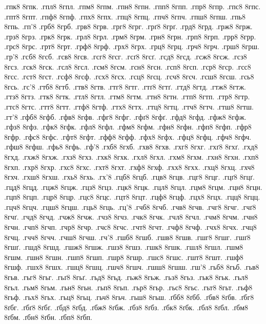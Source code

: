 {.гпк8 8гпк.
.гпл8 8гпл.
.гпм8 8гпм.
.гпн8 8гпн.
.гпп8 8гпп.
.гпр8 8гпр.
.гпс8 8гпс.
.гпт8 8гпт.
.гпф8 8гпф.
.гпх8 8гпх.
.гпц8 8гпц.
.гпч8 8гпч.
.гпш8 8гпш.
.гпь8 8гпь.
.гп'8
.грб8 8грб.
.грв8 8грв.
.грг8 8грг.
.грґ8 8грґ.
.грд8 8грд.
.грж8 8грж.
.грз8 8грз.
.грк8 8грк.
.грл8 8грл.
.грм8 8грм.
.грн8 8грн.
.грп8 8грп.
.грр8 8грр.
.грс8 8грс.
.грт8 8грт.
.грф8 8грф.
.грх8 8грх.
.грц8 8грц.
.грч8 8грч.
.грш8 8грш.
.гр'8
.гсб8 8гсб.
.гсв8 8гсв.
.гсг8 8гсг.
.гсґ8 8гсґ.
.гсд8 8гсд.
.гсж8 8гсж.
.гсз8 8гсз.
.гск8 8гск.
.гсл8 8гсл.
.гсм8 8гсм.
.гсн8 8гсн.
.гсп8 8гсп.
.гср8 8гср.
.гсс8 8гсс.
.гст8 8гст.
.гсф8 8гсф.
.гсх8 8гсх.
.гсц8 8гсц.
.гсч8 8гсч.
.гсш8 8гсш.
.гсь8 8гсь.
.гс'8
.гтб8 8гтб.
.гтв8 8гтв.
.гтг8 8гтг.
.гтґ8 8гтґ.
.гтд8 8гтд.
.гтж8 8гтж.
.гтз8 8гтз.
.гтк8 8гтк.
.гтл8 8гтл.
.гтм8 8гтм.
.гтн8 8гтн.
.гтп8 8гтп.
.гтр8 8гтр.
.гтс8 8гтс.
.гтт8 8гтт.
.гтф8 8гтф.
.гтх8 8гтх.
.гтц8 8гтц.
.гтч8 8гтч.
.гтш8 8гтш.
.гт'8
.гфб8 8гфб.
.гфв8 8гфв.
.гфг8 8гфг.
.гфґ8 8гфґ.
.гфд8 8гфд.
.гфж8 8гфж.
.гфз8 8гфз.
.гфк8 8гфк.
.гфл8 8гфл.
.гфм8 8гфм.
.гфн8 8гфн.
.гфп8 8гфп.
.гфр8 8гфр.
.гфс8 8гфс.
.гфт8 8гфт.
.гфф8 8гфф.
.гфх8 8гфх.
.гфц8 8гфц.
.гфч8 8гфч.
.гфш8 8гфш.
.гфь8 8гфь.
.гф'8
.гхб8 8гхб.
.гхв8 8гхв.
.гхг8 8гхг.
.гхґ8 8гхґ.
.гхд8 8гхд.
.гхж8 8гхж.
.гхз8 8гхз.
.гхк8 8гхк.
.гхл8 8гхл.
.гхм8 8гхм.
.гхн8 8гхн.
.гхп8 8гхп.
.гхр8 8гхр.
.гхс8 8гхс.
.гхт8 8гхт.
.гхф8 8гхф.
.гхх8 8гхх.
.гхц8 8гхц.
.гхч8 8гхч.
.гхш8 8гхш.
.гхь8 8гхь.
.гх'8
.гцб8 8гцб.
.гцв8 8гцв.
.гцг8 8гцг.
.гцґ8 8гцґ.
.гцд8 8гцд.
.гцж8 8гцж.
.гцз8 8гцз.
.гцк8 8гцк.
.гцл8 8гцл.
.гцм8 8гцм.
.гцн8 8гцн.
.гцп8 8гцп.
.гцр8 8гцр.
.гцс8 8гцс.
.гцт8 8гцт.
.гцф8 8гцф.
.гцх8 8гцх.
.гцц8 8гцц.
.гцч8 8гцч.
.гцш8 8гцш.
.гць8 8гць.
.гц'8
.гчб8 8гчб.
.гчв8 8гчв.
.гчг8 8гчг.
.гчґ8 8гчґ.
.гчд8 8гчд.
.гчж8 8гчж.
.гчз8 8гчз.
.гчк8 8гчк.
.гчл8 8гчл.
.гчм8 8гчм.
.гчн8 8гчн.
.гчп8 8гчп.
.гчр8 8гчр.
.гчс8 8гчс.
.гчт8 8гчт.
.гчф8 8гчф.
.гчх8 8гчх.
.гчц8 8гчц.
.гчч8 8гчч.
.гчш8 8гчш.
.гч'8
.гшб8 8гшб.
.гшв8 8гшв.
.гшг8 8гшг.
.гшґ8 8гшґ.
.гшд8 8гшд.
.гшж8 8гшж.
.гшз8 8гшз.
.гшк8 8гшк.
.гшл8 8гшл.
.гшм8 8гшм.
.гшн8 8гшн.
.гшп8 8гшп.
.гшр8 8гшр.
.гшс8 8гшс.
.гшт8 8гшт.
.гшф8 8гшф.
.гшх8 8гшх.
.гшц8 8гшц.
.гшч8 8гшч.
.гшш8 8гшш.
.гш'8
.гьб8 8гьб.
.гьв8 8гьв.
.гьг8 8гьг.
.гьґ8 8гьґ.
.гьд8 8гьд.
.гьж8 8гьж.
.гьз8 8гьз.
.гьк8 8гьк.
.гьл8 8гьл.
.гьм8 8гьм.
.гьн8 8гьн.
.гьп8 8гьп.
.гьр8 8гьр.
.гьс8 8гьс.
.гьт8 8гьт.
.гьф8 8гьф.
.гьх8 8гьх.
.гьц8 8гьц.
.гьч8 8гьч.
.гьш8 8гьш.
.ґбб8 8ґбб.
.ґбв8 8ґбв.
.ґбг8 8ґбг.
.ґбґ8 8ґбґ.
.ґбд8 8ґбд.
.ґбж8 8ґбж.
.ґбз8 8ґбз.
.ґбк8 8ґбк.
.ґбл8 8ґбл.
.ґбм8 8ґбм.
.ґбн8 8ґбн.
.ґбп8 8ґбп.
}
